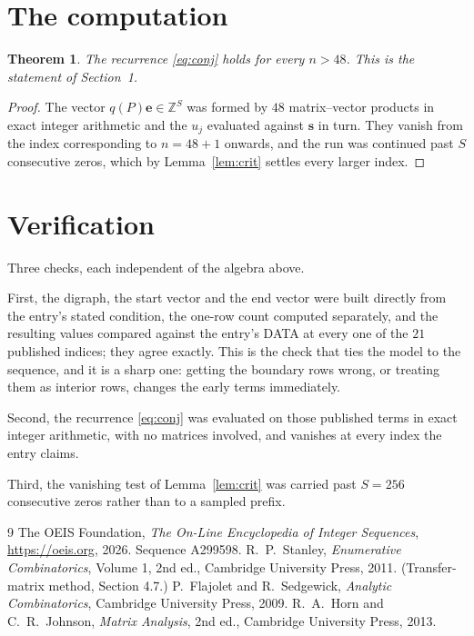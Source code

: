 \documentclass[11pt,a4paper]{article}
\theoremstyle{plain}
\newtheorem{theorem}{Theorem}
\theoremstyle{definition}
\begin{document}
\section{The computation}

\begin{theorem}
The recurrence \eqref{eq:conj} holds for every $n>48$. This is the statement of
Section~1.
\end{theorem}

\begin{proof}
The vector $q(P)\mathbf{e}\in\mathbb{Z}^{S}$ was formed by $48$ matrix--vector
products in exact integer arithmetic and the $u_j$ evaluated against $\mathbf{s}$ in turn.
They vanish from the index corresponding to $n=48+1$ onwards, and the run was continued
past $S$ consecutive zeros, which by Lemma~\ref{lem:crit} settles every larger index.
\end{proof}

\section{Verification}

Three checks, each independent of the algebra above.

First, the digraph, the start vector and the end vector were built directly from the
entry's stated condition, the one-row count computed separately, and the resulting values
compared against the entry's DATA at every one of the $21$ published indices; they
agree exactly. This is the check that ties the model to the sequence, and it is a sharp one:
getting the boundary rows wrong, or treating them as interior rows, changes the early terms
immediately.

Second, the recurrence \eqref{eq:conj} was evaluated on those published terms in exact
integer arithmetic, with no matrices involved, and vanishes at every index the entry claims.

Third, the vanishing test of Lemma~\ref{lem:crit} was carried past $S=256$ consecutive
zeros rather than to a sampled prefix.

\begin{thebibliography}{9}
 The OEIS Foundation, \emph{The On-Line Encyclopedia of Integer
Sequences}, \url{https://oeis.org}, 2026. Sequence A299598.
 R.~P.~Stanley, \emph{Enumerative Combinatorics}, Volume 1, 2nd ed.,
Cambridge University Press, 2011. (Transfer-matrix method, Section 4.7.)
 P.~Flajolet and R.~Sedgewick, \emph{Analytic Combinatorics}, Cambridge
University Press, 2009.
 R.~A.~Horn and C.~R.~Johnson, \emph{Matrix Analysis}, 2nd ed., Cambridge
University Press, 2013.
\end{thebibliography}
\end{document}
